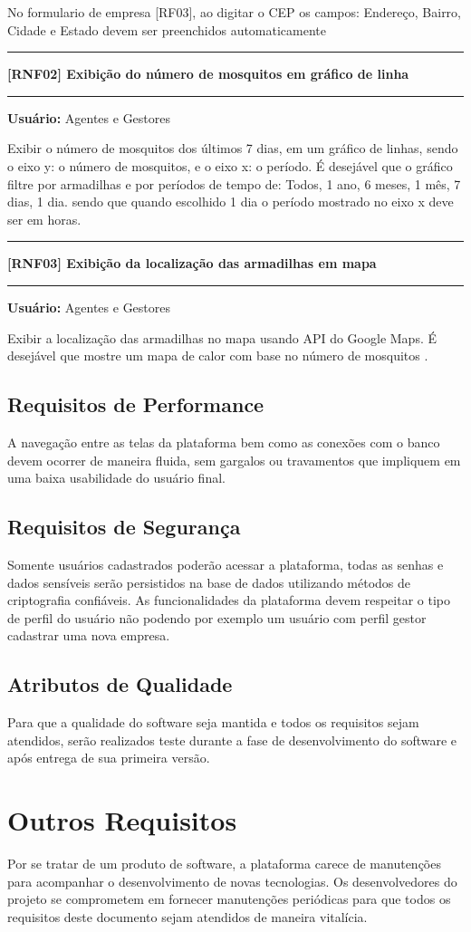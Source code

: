 	No formulario de empresa [RF03], ao digitar o CEP os campos: Endereço, Bairro, Cidade e Estado devem ser preenchidos automaticamente
	\begin{center}
		\noindent\rule{10cm}{0.4pt}
		\textbf{[RNF02] Exibição do número de mosquitos em gráfico de linha}
		\noindent\rule{10cm}{0.4pt}
	\end{center}
	\textbf{Usuário:} Agentes e Gestores
	
	Exibir o número de mosquitos dos últimos 7 dias, em um gráfico de linhas, sendo o eixo y: o número de mosquitos, e o eixo x: o período. 
	É desejável que o gráfico filtre por armadilhas e por períodos de tempo de: Todos, 1 ano, 6 meses, 1 mês, 7 dias, 1 dia. sendo que quando escolhido 
	1 dia o período mostrado no eixo x deve ser em horas.
	\begin{center}
		\noindent\rule{10cm}{0.4pt}
		\textbf{[RNF03] Exibição da localização das armadilhas em mapa}
		\noindent\rule{10cm}{0.4pt}
	\end{center}
	\textbf{Usuário:} Agentes e Gestores
	
	Exibir a localização das armadilhas no mapa usando API do Google Maps. É desejável que mostre um mapa de calor com base no número de mosquitos .
	
	\section*{Requisitos de Performance}
	A navegação entre as telas da plataforma bem como as conexões com o banco devem ocorrer de maneira fluida, sem gargalos ou travamentos que impliquem em uma baixa usabilidade 
	do usuário final.
	
	\section*{Requisitos de Segurança}
	Somente usuários cadastrados poderão acessar a plataforma, todas as senhas e dados sensíveis serão persistidos na base de dados utilizando métodos de criptografia confiáveis.
	As funcionalidades da plataforma devem respeitar o tipo de perfil do usuário não podendo por exemplo um usuário com perfil gestor cadastrar uma nova empresa.
	
	\section*{Atributos de Qualidade}
	Para que a qualidade do software seja mantida e todos os requisitos sejam atendidos, serão realizados teste durante a fase de desenvolvimento do software e após 
	entrega de sua primeira versão.
	
	\chapter*{Outros Requisitos}
	Por se tratar de um produto de software, a plataforma carece de manutenções para acompanhar o desenvolvimento de novas tecnologias. 
	Os desenvolvedores do projeto se comprometem em fornecer manutenções periódicas para que todos os requisitos deste documento sejam atendidos de maneira vitalícia.